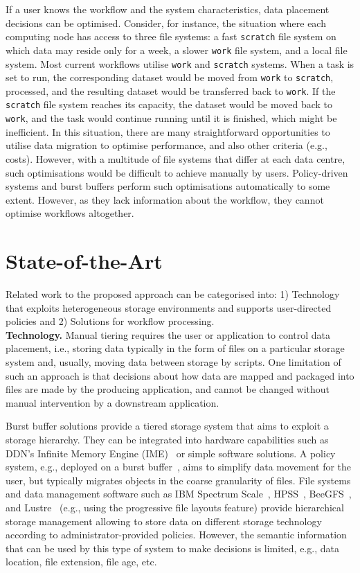 \documentclass{superfri}
\begin{document}
If a user knows the workflow and the system characteristics, data placement decisions can be optimised.
Consider, for instance, the situation where each computing node has access to three file systems: a fast \texttt{scratch} file system on which data may reside only for a week, a slower \texttt{work} file system, and a local file system.
Most current workflows utilise \texttt{work} and \texttt{scratch} systems.
When a task is set to run, the corresponding dataset would be moved from \texttt{work} to \texttt{scratch}, processed, and the resulting dataset would be transferred back to \texttt{work}.
If the \texttt{scratch} file system reaches its capacity, the dataset would be moved back to \texttt{work}, and the task would continue running until it is finished, which might be inefficient.
In this situation, there are many straightforward opportunities to utilise data migration to optimise performance, and also other criteria (e.g., costs).
However, with a multitude of file systems that differ at each data centre, such optimisations would be difficult to achieve manually by users.
Policy-driven systems and burst buffers perform such optimisations automatically to some extent. However, as they lack information about the workflow, they cannot optimise workflows altogether.

\section{State-of-the-Art}
\label{sec:art}

Related work to the proposed approach can be categorised into:
1) Technology that exploits heterogeneous storage environments and supports user-directed policies and
2) Solutions for workflow processing.\\

\textbf{Technology.}
Manual tiering requires the user or application to control data placement, i.e., storing data typically in the form of files on a particular storage system and, usually, moving data between storage by scripts.
One limitation of such an approach is that decisions about how data are mapped and packaged into files are made by the producing application, and cannot be changed without manual intervention by a downstream application.

Burst buffer solutions provide a tiered storage system that aims to exploit a storage hierarchy.
They can be integrated into hardware capabilities such as DDN's Infinite Memory Engine (IME)~\cite{BODIAIFSFI19} or simple software solutions.
A policy system, e.g., deployed on a burst buffer~\cite{RomanusRP15}, aims to simplify data movement for the user, but typically migrates objects in the coarse granularity of files.
File systems and data management software such as IBM Spectrum Scale~\cite{SchmuckH02}, HPSS~\cite{528214}, BeeGFS~\cite{beegfs}, and Lustre~\cite{abs-1903-01955} (e.g., using the progressive file layouts feature) provide hierarchical storage management allowing to store data on different storage technology according to administrator-provided policies.
However, the semantic information that can be used by this type of system to make decisions is limited, e.g., data location, file extension, file age, etc.
\end{document}
